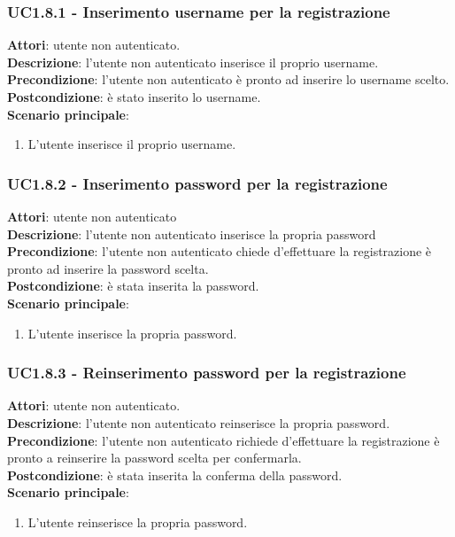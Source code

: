 	\subsubsection{UC1.8.1 - Inserimento username per la registrazione}{
		\label{uc1.8.1}
		\textbf{Attori}: utente non autenticato. \\
		\textbf{Descrizione}: l'utente non autenticato inserisce il proprio username.	\\
		\textbf{Precondizione}: l'utente non autenticato è pronto ad inserire lo username scelto.	\\
		\textbf{Postcondizione}: è stato inserito lo username.\\
		\textbf{Scenario principale}:
		\begin{enumerate}
			\item L'utente inserisce il proprio username.
		\end{enumerate}
		}
	\subsubsection{UC1.8.2 - Inserimento password per la registrazione} {
		\label{uc1.8.2}
		\textbf{Attori}: utente non autenticato \\
		\textbf{Descrizione}: l'utente non autenticato inserisce la propria password	\\
		\textbf{Precondizione}: l'utente non autenticato chiede d'effettuare la registrazione è pronto ad inserire la password scelta.	\\
		\textbf{Postcondizione}: è stata inserita la password.\\
		\textbf{Scenario principale}:
		\begin{enumerate}
			\item L'utente inserisce la propria password.
		\end{enumerate}
		}
	\subsubsection{UC1.8.3 - Reinserimento password per la registrazione} {
		\label{uc1.8.3}
		\textbf{Attori}: utente non autenticato. \\
		\textbf{Descrizione}: l'utente non autenticato reinserisce la propria password.	\\
		\textbf{Precondizione}: l'utente non autenticato richiede d'effettuare la registrazione è pronto a reinserire la password scelta per confermarla.	\\
		\textbf{Postcondizione}: è stata inserita la conferma della password.\\
		\textbf{Scenario principale}:
		\begin{enumerate}
			\item L'utente reinserisce la propria password.
		\end{enumerate}
		}
